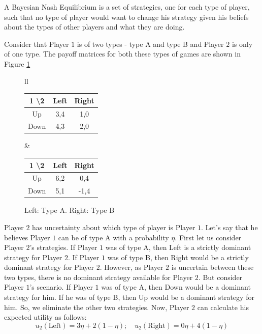 \documentclass{article}
\theoremstyle{definition}
\begin{document}
A Bayesian Nash Equilibrium is a set of strategies, one for each type of player, such that no type of player would want to change his strategy given his beliefs about the types of other players and what they are doing. \medskip

Consider that Player $1$ is of two types - type A and type B and Player $2$ is only of one type. The payoff matrices for both these types of games are shown in Figure \ref{fig:bayesian} \medskip

\begin{figure}[H]
    \centering
        \begin{tabular}{ll}
        \begin{tabular}{|c|c|c|}
            \hline
            1 \textbackslash 2 & Left & Right \\
              \hline
            Up & 3,4 & 1,0 \\
            \hline
            Down & 4,3 & 2,0\\
            \hline
        \end{tabular}
        &
        \begin{tabular}{|c|c|c|}
            \hline
            1 \textbackslash 2 & Left & Right \\
            \hline
            Up & 6,2 & 0,4 \\
            \hline
            Down & 5,1 & -1,4\\
            \hline
        \end{tabular}
    \end{tabular}
    \caption{Left: Type A. Right: Type B}
    \label{fig:bayesian}
\end{figure}

Player $2$ has uncertainty about which type of player is Player $1$. Let's say that he believes Player $1$ can be of type A with a probability $\eta$. First let us consider Player $2$'s strategies. If Player $1$ was of type A, then Left is a strictly dominant strategy for Player $2$. If Player $1$ was of type B, then Right would be a strictly dominant strategy for Player $2$. However, as Player $2$ is uncertain between these two types, there is no dominant strategy available for Player $2$. But consider Player $1$'s scenario. If Player $1$ was of type A, then Down would be a dominant strategy for him. If he was of type B, then Up would be a dominant strategy for him. So, we eliminate the other two strategies. Now, Player $2$ can calculate his expected utility as follows:
\[
    u_2(\text{Left}) = 3 \eta + 2 ( 1 - \eta) ; \quad u_2(\text{Right}) = 0 \eta + 4 ( 1- \eta) 
\]
\end{document}
